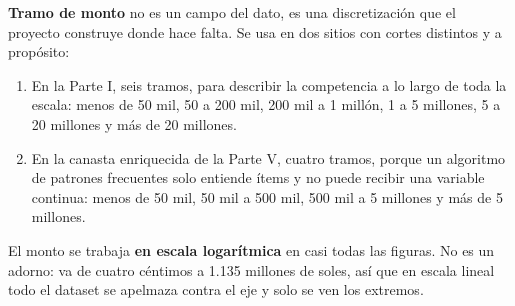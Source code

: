 \documentclass[11pt]{article}
\begin{document}
\textbf{Tramo de monto} no es un campo del dato, es una discretización que el proyecto construye donde hace falta. Se usa en dos sitios con cortes distintos y a propósito:

\begin{enumerate}
  \item En la Parte I, seis tramos, para describir la competencia a lo largo de toda la escala: menos de 50 mil, 50 a 200 mil, 200 mil a 1 millón, 1 a 5 millones, 5 a 20 millones y más de 20 millones.
  \item En la canasta enriquecida de la Parte V, cuatro tramos, porque un algoritmo de patrones frecuentes solo entiende ítems y no puede recibir una variable continua: menos de 50 mil, 50 mil a 500 mil, 500 mil a 5 millones y más de 5 millones.
\end{enumerate}
El monto se trabaja \textbf{en escala logarítmica} en casi todas las figuras. No es un adorno: va de cuatro céntimos a 1.135 millones de soles, así que en escala lineal todo el dataset se apelmaza contra el eje y solo se ven los extremos.

\end{document}
